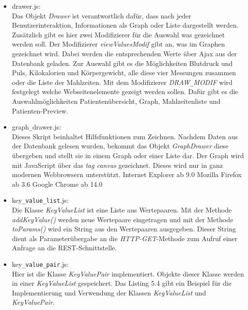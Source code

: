 \begin{itemize}
 \item drawer.js:\\
 Das Objekt \emph{Drawer} ist verantwortlich daf\"ur,
 dass nach jeder Benutzerinteraktion, Informationen als Graph oder Liste dargestellt werden.
 Zus\"atzlich gibt es hier zwei Modifizierer f\"ur die Auswahl was gezeichnet werden soll.
 Der Modifizierer \emph{viewValuesModif} gibt an, was im Graphen gezeichnet wird.
 Dabei werden die entsprechenden Werte \"uber Ajax aus der Datenbank geladen.
 Zur Auswahl gibt es die M\"oglichkeiten Blutdruck und Puls, Kilokalorien und K\"orpergewicht, 
 alle diese vier Messungen zusammen oder die Liste der Mahlzeiten.
 Mit dem Modifizierer \emph{DRAW\texttt{\_}MODIF} wird festgelegt welche Webseitenelemente gezeigt werden sollen.
 Daf\"ur gibt es die Auswahlm\"oglichkeiten Patienten\"ubersicht, Graph, Mahlzeitenliste und Patienten-Preview.
 
 \item graph\texttt{\_}drawer.js:\\
 Dieses Skript beinhaltet Hilfsfunktionen zum Zeichnen.
 Nachdem Daten aus der Datenbank gelesen wurden, 
 bekommt das Objekt \emph{GraphDrawer} diese \"ubergeben und stellt sie in einem Graph oder einer Liste dar.
 Der Graph wird mit JavaScript \"uber das \emph{tag canvas} gezeichnet.
 Dieses wird nur in ganz modernen Webbrowsern unterst\"utzt.
 \subitem Internet Explorer ab 9.0
 \subitem Mozilla Firefox ab 3.6
 \subitem Google Chrome ab 14.0
 
 \item key\texttt{\_value\_list}.js:\\
 Die Klasse \emph{KeyValueList} ist eine Liste aus Wertepaaren.
 Mit der Methode \emph{addKeyValue()} werden neue Wertepaare eingetragen und mit der Methode
 \emph{toParams()} wird ein String aus den Wertepaaren ausgegeben.
 Dieser String dient als Parameter\"ubergabe an die \emph{HTTP-GET}-Methode zum Aufruf einer 
 Anfrage an die REST-Schnittstelle.
 
 \item key\texttt{\_value\_pair}.js:\\
 Hier ist die Klasse \emph{KeyValuePair} implementiert.
 Objekte dieser Klasse werden in einer \emph{KeyValueList} gespeichert.
 Das Listing 5.4 gibt ein Beispiel f\"ur die Implementierung und Verwendung der Klassen \emph{KeyValueList} 
 und \emph{KeyValuePair}.\\
 

\end{itemize}
